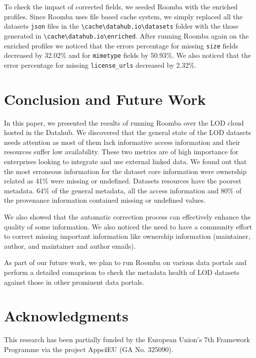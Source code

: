 \documentclass[runningheads,a4paper]{llncs}
\begin{document}
To check the impact of corrected fields, we seeded Roomba with the enriched profiles. Since Roomba uses file based cache system, we simply replaced all the datasets \texttt{json} files in the \texttt{\textbackslash cache\textbackslash datahub.io\textbackslash datasets} folder with the those generated in \texttt{\textbackslash cache\textbackslash datahub.io\textbackslash enriched}. After running Roomba again on the enriched profiles we noticed that the errors percentage for missing \texttt{size} fields decreased by 32.02\% and for \texttt{mimetype} fields by 50.93\%. We also noticed that the error percentage for missing \texttt{license\_urls} decreased by 2.32\%.

\section{Conclusion and Future Work}
\label{sec:conclusion}

In this paper, we presented the results of running Roomba over the LOD cloud hosted in the Datahub. We discovered that the general state of the LOD datasets needs attention as most of them lack informative access information and their resources suffer low availability. These two metrics are of high importance for enterprises looking to integrate and use external linked data. We found out that the most erroneous information for the dataset core information were ownership related as 41\% were missing or undefined. Datasets resources have the poorest metadata. 64\% of the general metadata, all the access information and 80\% of the provenance information contained missing or undefined values.

We also showed that the automatic correction process can effectively enhance the quality of some information. We also noticed the need to have a community effort to correct missing important information like ownership information (maintainer, author, and maintainer and author emails).

As part of our future work, we plan to run Roomba on various data portals and perform a detailed comaprison to check the metadata health of LOD datasets against those in other prominent data portals.


\section*{Acknowledgments}
This research has been partially funded by the European Union's 7th Framework Programme via the project Apps4EU (GA No. 325090).
\vspace{0.5cm}


\nocite{*}

\end{document}

